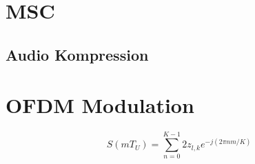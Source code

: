 \section{MSC}
\subsection{Audio Kompression}

\section{OFDM Modulation}

\begin{equation}
    S(m T_U) = \sum \limits_{n=0}^{K-1} 2 z_{l,k} e^{-j(2 \pi n m / K)}
\label{eq:ofdm_dft}
\end{equation}
